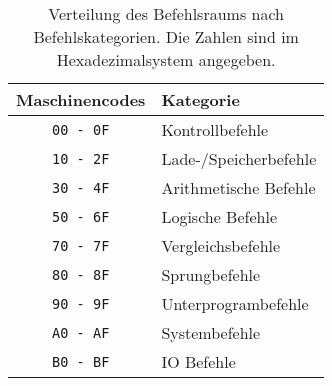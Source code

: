 \begin{table}
  \centering
  \begin{tabular}{|c|l|}                        \hline
    Maschinencodes   & Kategorie              \\\hline\hline
    \texttt{00 - 0F} & Kontrollbefehle        \\
    \texttt{10 - 2F} & Lade-/Speicherbefehle  \\
    \texttt{30 - 4F} & Arithmetische Befehle  \\
    \texttt{50 - 6F} & Logische Befehle       \\
    \texttt{70 - 7F} & Vergleichsbefehle      \\
    \texttt{80 - 8F} & Sprungbefehle          \\
    \texttt{90 - 9F} & Unterprogrambefehle    \\
    \texttt{A0 - AF} & Systembefehle          \\
    \texttt{B0 - BF} & IO Befehle             \\\hline
  \end{tabular}
  \caption[Verteilung des Befehlsraums]
          {Verteilung des Befehlsraums nach Befehlskategorien.
          Die Zahlen sind im Hexadezimalsystem angegeben.}
  \label{tab:Befehlraumverteilung}
\end{table}

